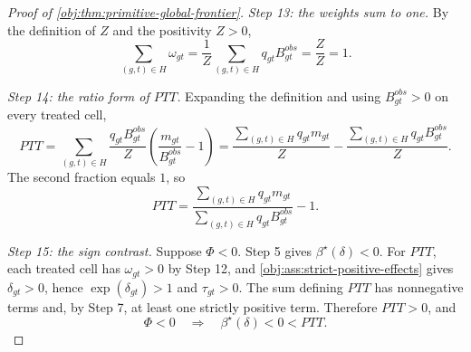 \begin{proof}[Proof of \cref{obj:thm:primitive-global-frontier}]
\textit{Step 13: the weights sum to one.} By the definition of \(Z\) and the positivity \(Z>0\),
\[
\sum_{(g,t)\in H}\omega_{gt}
=
\frac{1}{Z}\sum_{(g,t)\in H}q_{gt}B^{obs}_{gt}
=
\frac{Z}{Z}
=
1 .
\]

\textit{Step 14: the ratio form of \(PTT\).} Expanding the definition and using \(B^{obs}_{gt}>0\) on every treated cell,
\[
PTT
=
\sum_{(g,t)\in H}\frac{q_{gt}B^{obs}_{gt}}{Z}\left(\frac{m_{gt}}{B^{obs}_{gt}}-1\right)
=
\frac{\sum_{(g,t)\in H}q_{gt}m_{gt}}{Z}
-
\frac{\sum_{(g,t)\in H}q_{gt}B^{obs}_{gt}}{Z}.
\]
The second fraction equals \(1\), so
\[
PTT=\frac{\sum_{(g,t)\in H}q_{gt}m_{gt}}{\sum_{(g,t)\in H}q_{gt}B^{obs}_{gt}}-1 .
\]

\textit{Step 15: the sign contrast.} Suppose \(\Phi<0\). Step 5 gives \(\beta^\star(\delta)<0\). For \(PTT\), each treated cell has \(\omega_{gt}>0\) by Step 12, and \cref{obj:ass:strict-positive-effects} gives \(\delta_{gt}>0\), hence \(\exp(\delta_{gt})>1\) and \(\tau_{gt}>0\). The sum defining \(PTT\) has nonnegative terms and, by Step 7, at least one strictly positive term. Therefore \(PTT>0\), and
\[
\Phi<0\quad\Longrightarrow\quad \beta^\star(\delta)<0<PTT .
\]
\end{proof}

